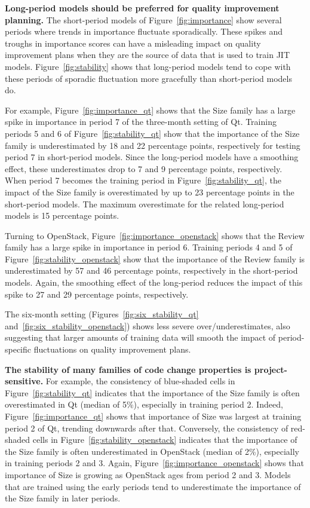 {\textbf{Long-period models should be preferred for quality improvement planning.}
The short-period models of Figure~\ref{fig:importance} show several periods where trends in importance fluctuate sporadically.
These spikes and troughs in importance scores can have a misleading impact on quality improvement plans when they are the source of data that is used to train JIT models.
Figure~\ref{fig:stability} shows that long-period models tend to cope with these periods of sporadic fluctuation more gracefully than short-period models do.

For example, Figure~\ref{fig:importance_qt} shows that the Size family has a large spike in importance in period 7 of the three-month setting of {\sc Qt}.
Training periods 5 and 6 of Figure~\ref{fig:stability_qt} show that the importance of the Size family is underestimated by 18 and 22 percentage points, respectively for testing period 7 in short-period models.
Since the long-period models have a smoothing effect, these underestimates drop to 7 and 9 percentage points, respectively.
When period 7 becomes the training period in Figure~\ref{fig:stability_qt}, the impact of the Size family is overestimated by up to 23 percentage points in the short-period models.
The maximum overestimate for the related long-period models is 15 percentage points.

Turning to {\sc OpenStack}, Figure~\ref{fig:importance_openstack} shows that the Review family has a large spike in importance in period 6.
Training periods 4 and 5 of Figure~\ref{fig:stability_openstack} show that the importance of the Review family is underestimated by 57 and 46 percentage points, respectively in the short-period models.
Again, the smoothing effect of the long-period reduces the impact of this spike to 27 and 29 percentage points, respectively.

The six-month setting (Figures~\ref{fig:six_stability_qt} and~\ref{fig:six_stability_openstack}) shows less severe over/underestimates, also suggesting that larger amounts of training data will smooth the impact of period-specific fluctuations on quality improvement plans.

\textbf{The stability of many families of code change properties is project-sensitive.}
For example, the consistency of blue-shaded cells in Figure~\ref{fig:stability_qt} indicates that the importance of the Size family is often overestimated in {\sc Qt} (median of 5\%), especially in training period 2.
Indeed, Figure~\ref{fig:importance_qt} shows that importance of Size was largest at training period 2 of {\sc Qt}, trending downwards after that.
Conversely, the consistency of red-shaded cells in Figure~\ref{fig:stability_openstack} indicates that the importance of the Size family is often underestimated in {\sc OpenStack} (median of 2\%), especially in training periods 2 and 3.
Again, Figure~\ref{fig:importance_openstack} shows that importance of Size is growing as {\sc OpenStack} ages from period 2 and 3.
Models that are trained using the early periods tend to underestimate the importance of the Size family in later periods.

}

